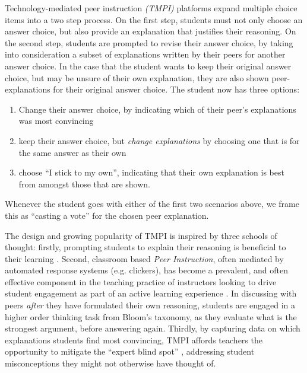 \documentclass[sigconf]{acmart}
\begin{document}
Technology-mediated peer instruction \textit{(TMPI)} platforms 
\cite{charles_harnessing_2019}\cite{univeristy_of_british_columbia_ubc/ubcpi_2019}
expand multiple choice items into a two step process.
On the first step, students must not only choose an answer choice, but also 
provide an explanation that justifies their reasoning. 
On the second step, students are prompted to revise their answer choice, by 
taking into consideration a subset of explanations written by their peers for
another answer choice.
In the case that the student wants to keep their original answer choice, but 
may be unsure of their own explanation, they are also shown peer-explanations 
for their original answer choice. 
The student now has three options:
\begin{enumerate}
	\item Change their answer choice, by indicating which of their peer's 
	explanations was most convincing
	\item keep their answer choice, but \textit{change explanations} by 
	choosing one that is for the same answer as their own
	\item choose ``I stick to my own'', indicating that their own explanation 
	is best from amongst those that are shown.
\end{enumerate}

Whenever the student goes with either of the first two scenarios above, we 
frame this as ``casting a vote'' for the chosen peer explanation.

The design and growing popularity of TMPI is inspired by three schools of 
thought: firstly, prompting students to explain their reasoning is beneficial 
to their learning \cite{chi_eliciting_1994}. 
Second, classroom based \textit{Peer Instruction}\cite{crouch_peer_2001}, often 
mediated by automated response systems (e.g. clickers), has become a prevalent, 
and often effective component in the teaching practice of instructors looking 
to drive student engagement as part of an active learning experience 
\cite{charles_beyond_2015}. 
In discussing with peers \textit{after} they have formulated their own 
reasoning, students are engaged in a higher order thinking task from Bloom's 
taxonomy, as they evaluate what is the strongest argument, before answering 
again.
Thirdly, by capturing data on which explanations students find most convincing, 
TMPI affords teachers the opportunity to mitigate the ``expert blind spot'' 
\cite{nathan_expert_2001}, addressing student misconceptions they might not 
otherwise have thought of.
\end{document}
